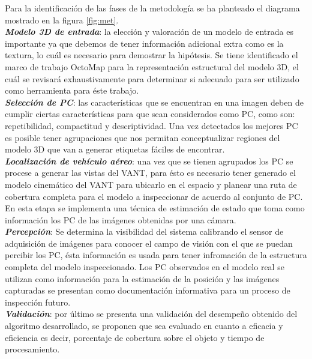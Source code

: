 \documentclass[]{report}
\begin{document}
Para la identificación de las fases de la metodología se ha planteado el diagrama mostrado en la figura \ref{fig:met}.\\
\textbf{\textit{Modelo 3D de entrada}}: la elección y valoración de un modelo de entrada es importante ya que debemos de tener información adicional extra como es la textura, lo cuál es necesario para demostrar la hipótesis. Se tiene identificado el marco de trabajo OctoMap para la representación estructural del modelo 3D, el cuál se revisará exhaustivamente para determinar si adecuado para ser utilizado como herramienta para éste trabajo.\\
\textbf{\textit{Selección de PC}}: las características que se encuentran en una imagen deben de cumplir ciertas características para que sean considerados como PC, como son: repetibilidad, compactitud y descriptividad. Una vez detectados los mejores PC es posible tener agrupaciones que nos permitan conceptualizar regiones del modelo 3D que van a generar etiquetas fáciles de encontrar.  \\
\textbf{\textit{Localización de vehículo aéreo}}: una vez que se tienen agrupados los PC se procese a generar las vistas del VANT, para ésto es necesario tener generado el modelo cinemático del VANT para ubicarlo en el espacio y planear una ruta de cobertura completa para el modelo a inspeccionar de acuerdo al conjunto de PC. En esta etapa se implementa una técnica de estimación de estado que toma como información los PC de las imágenes obtenidas por una cámara.\\
\textbf{\textit{Percepción}}: Se determina la visibilidad del sistema calibrando el sensor de adquisición de imágenes para conocer el campo de visión con el que se puedan percibir los PC,  ésta información es usada para tener infromación de la estructura completa del modelo inspeccionado. Los PC observados en el modelo real se utilizan como información para la estimación de la posición y las imágenes capturadas se presentan como documentación informativa para un proceso de inspección futuro.\\
\textbf{\textit{Validación}}: por último se presenta una validación del desempeño obtenido del algoritmo desarrollado, se proponen que sea evaluado en cuanto a eficacia y eficiencia es decir, porcentaje de cobertura sobre el objeto y tiempo de procesamiento.\\
\end{document}
